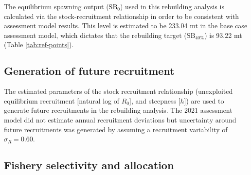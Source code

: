 \documentclass[11pt,
  english,
  a4paper,
]{article}
\begin{document}
The equilibrium spawning output ({\(\text{SB}_0\)\leavevmode\tagmcend\tagstructend}) used in this rebuilding analysis is calculated via the stock-recruitment relationship in order to be consistent with assessment model results. This level is estimated to be 233.04 mt in the base case assessment model, which dictates that the rebuilding target ({\(\text{SB}_{40\%}\)\leavevmode\tagmcend\tagstructend}) is 93.22 mt (Table \ref{tab:ref-points}).

\leavevmode\tagmcend\tagstructend\par


\hypertarget{generation-of-future-recruitment}{%
\subsection{Generation of future recruitment}\label{generation-of-future-recruitment}}

\leavevmode\tagmcend\tagstructend


The estimated parameters of the stock recruitment relationship (unexploited equilibrium recruitment {[}natural log of {\(R_0\)\leavevmode\tagmcend\tagstructend}{]}, and steepness {[}{\(h\)\leavevmode\tagmcend\tagstructend}{]}) are used to generate future recruitments in the rebuilding analysis. The 2021 assessment model did not estimate annual recruitment deviations but uncertainty around future recruitments was generated by assuming a recruitment variability of {\(\sigma_R = 0.60\)\leavevmode\tagmcend\tagstructend}.

\leavevmode\tagmcend\tagstructend\par


\hypertarget{fishery-selectivity-and-allocation}{%
\subsection{Fishery selectivity and allocation}\label{fishery-selectivity-and-allocation}}

\leavevmode\tagmcend\tagstructend
\end{document}
